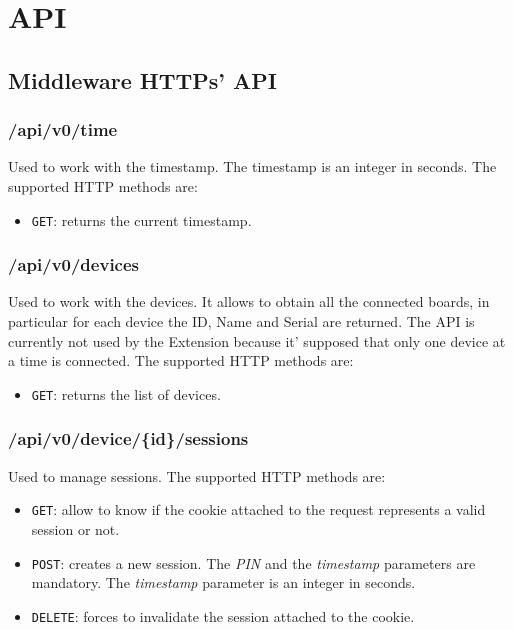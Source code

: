 \chapter{API}
\label{api}

\section*{Middleware HTTPs' API}

\subsection{/api/v0/time}
Used to work with the timestamp. The timestamp is an integer in seconds. The supported HTTP methods are:

\begin{itemize}
    \item \texttt{GET}: returns the current timestamp.
\end{itemize}

\subsection{/api/v0/devices}
Used to work with the devices. It allows to obtain all the connected boards, in particular for each device the ID, Name and Serial are returned. The API is currently not used by the Extension because it' supposed that only one device at a time is connected. The supported HTTP methods are:

\begin{itemize}
    \item \texttt{GET}: returns the list of devices.
\end{itemize}

\subsection{/api/v0/device/\{id\}/sessions}
Used to manage sessions. The supported HTTP methods are:

\begin{itemize}
    \item \texttt{GET}: allow to know if the cookie attached to the request represents a valid session or not.
    \item \texttt{POST}: creates a new session. The \textit{PIN} and the \textit{timestamp} parameters are mandatory. The \textit{timestamp} parameter is an integer in seconds.
    \item \texttt{DELETE}: forces to invalidate the session attached to the cookie.
\end{itemize}

